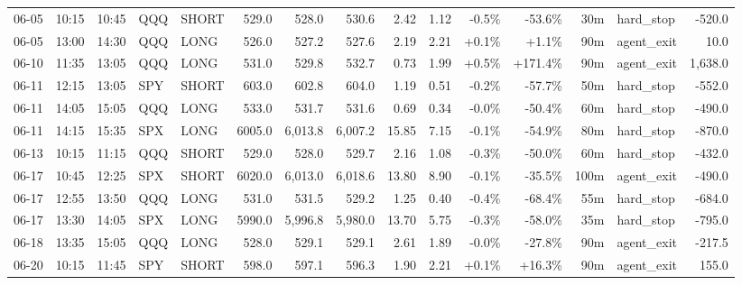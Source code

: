 \documentclass[11pt,a4paper,twoside]{article}
\begin{document}
\begin{landscape}
\begin{center}
\begin{longtable}{>{\color{txtmain}}l l l l l r r r r r r r r >{\color{txtmain}}l r}
06-05 & 10:15 & 10:45 & QQQ & SHORT & 529.0 & 528.0 & 530.6 & 2.42 & 1.12 & \textcolor{lossred}{-0.5\%} & \textcolor{lossred}{-53.6\%} & 30m & hard\_stop & \textcolor{lossred}{-520.0} \\
06-05 & 13:00 & 14:30 & QQQ & LONG & 526.0 & 527.2 & 527.6 & 2.19 & 2.21 & \textcolor{wingreen}{+0.1\%} & \textcolor{wingreen}{+1.1\%} & 90m & agent\_exit & \textcolor{wingreen}{10.0} \\
06-10 & 11:35 & 13:05 & QQQ & LONG & 531.0 & 529.8 & 532.7 & 0.73 & 1.99 & \textcolor{wingreen}{+0.5\%} & \textcolor{wingreen}{+171.4\%} & 90m & agent\_exit & \textcolor{wingreen}{1,638.0} \\
06-11 & 12:15 & 13:05 & SPY & SHORT & 603.0 & 602.8 & 604.0 & 1.19 & 0.51 & \textcolor{lossred}{-0.2\%} & \textcolor{lossred}{-57.7\%} & 50m & hard\_stop & \textcolor{lossred}{-552.0} \\
06-11 & 14:05 & 15:05 & QQQ & LONG & 533.0 & 531.7 & 531.6 & 0.69 & 0.34 & \textcolor{lossred}{-0.0\%} & \textcolor{lossred}{-50.4\%} & 60m & hard\_stop & \textcolor{lossred}{-490.0} \\
06-11 & 14:15 & 15:35 & SPX & LONG & 6005.0 & 6,013.8 & 6,007.2 & 15.85 & 7.15 & \textcolor{lossred}{-0.1\%} & \textcolor{lossred}{-54.9\%} & 80m & hard\_stop & \textcolor{lossred}{-870.0} \\
06-13 & 10:15 & 11:15 & QQQ & SHORT & 529.0 & 528.0 & 529.7 & 2.16 & 1.08 & \textcolor{lossred}{-0.3\%} & \textcolor{lossred}{-50.0\%} & 60m & hard\_stop & \textcolor{lossred}{-432.0} \\
06-17 & 10:45 & 12:25 & SPX & SHORT & 6020.0 & 6,013.0 & 6,018.6 & 13.80 & 8.90 & \textcolor{lossred}{-0.1\%} & \textcolor{lossred}{-35.5\%} & 100m & agent\_exit & \textcolor{lossred}{-490.0} \\
06-17 & 12:55 & 13:50 & QQQ & LONG & 531.0 & 531.5 & 529.2 & 1.25 & 0.40 & \textcolor{lossred}{-0.4\%} & \textcolor{lossred}{-68.4\%} & 55m & hard\_stop & \textcolor{lossred}{-684.0} \\
06-17 & 13:30 & 14:05 & SPX & LONG & 5990.0 & 5,996.8 & 5,980.0 & 13.70 & 5.75 & \textcolor{lossred}{-0.3\%} & \textcolor{lossred}{-58.0\%} & 35m & hard\_stop & \textcolor{lossred}{-795.0} \\
06-18 & 13:35 & 15:05 & QQQ & LONG & 528.0 & 529.1 & 529.1 & 2.61 & 1.89 & \textcolor{lossred}{-0.0\%} & \textcolor{lossred}{-27.8\%} & 90m & agent\_exit & \textcolor{lossred}{-217.5} \\
06-20 & 10:15 & 11:45 & SPY & SHORT & 598.0 & 597.1 & 596.3 & 1.90 & 2.21 & \textcolor{wingreen}{+0.1\%} & \textcolor{wingreen}{+16.3\%} & 90m & agent\_exit & \textcolor{wingreen}{155.0} \\

\end{longtable}
\end{center}
\end{landscape}
\end{document}

